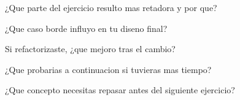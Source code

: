 
\begin{DoxyEnumerate}
\item ¿\+Que parte del ejercicio resulto mas retadora y por que?
\item ¿\+Que caso borde influyo en tu diseno final?
\item Si refactorizaste, ¿que mejoro tras el cambio?
\item ¿\+Que probarias a continuacion si tuvieras mas tiempo?
\item ¿\+Que concepto necesitas repasar antes del siguiente ejercicio? 
\end{DoxyEnumerate}